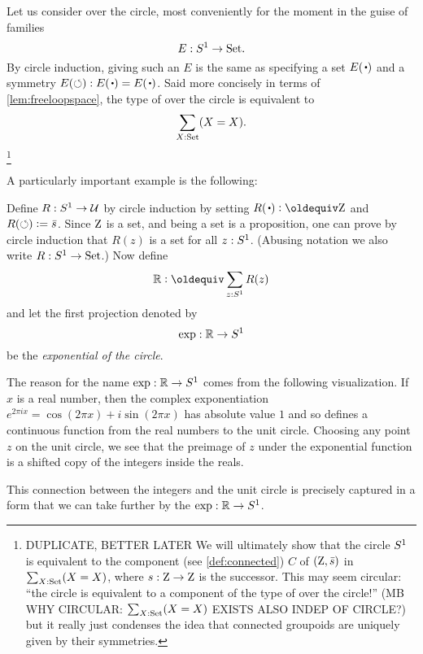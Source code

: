 \begin{example}\label{xca:coveringsofS1}
Let us consider \coverings over the circle, most conveniently 
for the moment in the guise of families 
$$E:{S^1}\to\mathord{\mathrm{Set}}.$$
By circle induction, giving such an $E$ is the same as 
specifying a set $E(\base)$ and a symmetry $E(\Sloop):E(\base)=E(\base)$.  
Said more concisely in terms of \cref{lem:freeloopspace}, 
the type of \coverings over the circle is equivalent to 
$$\sum_{X:\mathord{\mathrm{Set}}}(X=X).$$ \footnote{\color{blue}%
DUPLICATE, BETTER LATER
We will ultimately show that the circle ${S^1}$ is equivalent to the 
component (see \cref{def:connected}) $C$ of $(\mathrm{Z},\bar {s})$ in $\sum_{X:\mathord{\mathrm{Set}}}(X=X)$,  
where $s:\mathrm{Z}\to\mathrm{Z}$ is the successor.  This may seem circular: ``the circle is equivalent to a component of the type of \coverings over the circle!'' 
(MB WHY CIRCULAR: $\sum_{X:\mathord{\mathrm{Set}}}(X=X)$ EXISTS ALSO INDEP OF CIRCLE?)
but it really just condenses the idea that connected groupoids are uniquely 
given by their symmetries.}
\end{example}
A particularly important example is the following:
\begin{definition}\label{def:RtoS1}
Define $R:{S^1}\to\mathcal{U}$ by circle induction by setting 
$R(\base)\defeq\zet$ and $R(\circlearrowleft)\vcentcolon= \bar {s}$.
Since $\mathrm{Z}$ is a set, and being a set is a proposition,
one can prove by circle induction that $R(z)$ is a set for all $z:{S^1}$.
(Abusing notation we also write $R:{S^1}\to\mathord{\mathrm{Set}}$.) Now define
$$\RR\defeq\sum_{z:\Sc}R(z)$$
and let the first projection denoted by
$$\exp:\mathbb{R}\to {S^1}$$
be the \emph{exponential \covering of the circle}.
\end{definition}

\begin{remark}
  \label{rem:expforreal}
  The reason for the name $\exp:\mathbb{R}\to {S^1}$ comes from the following visualization.  
If $x$ is a real number, then the complex exponentiation 
$e^{2\pi i x}=\cos(2\pi x)+i\sin(2\pi x)$ has absolute value $1$ and 
so defines a continuous function from the real numbers to the unit circle.  
Choosing any point $z$ on the unit circle, we see that the preimage of $z$ under the exponential function is a shifted copy of the integers inside the reals. 
 
This connection between the integers and the unit circle is precisely captured in a form that we can take further by the \covering $\exp:\mathbb{R}\to {S^1}$.
\end{remark}

